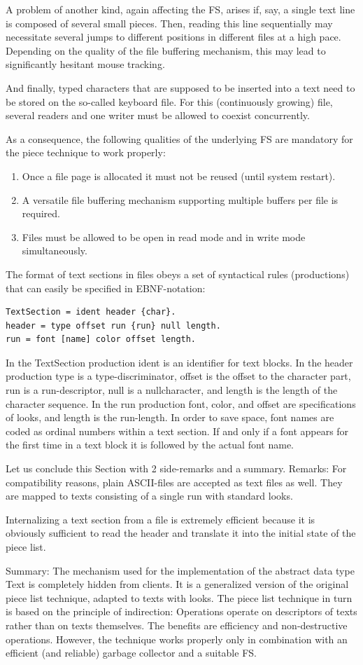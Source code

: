 A problem of another kind, again affecting the FS, arises if, say, a single text line is
composed of several small pieces. Then, reading this line sequentially may necessitate several
jumps to different positions in different files at a high pace. Depending on the quality of the file
buffering mechanism, this may lead to significantly hesitant mouse tracking.

And finally, typed characters that are supposed to be inserted into a text need to be stored on the
so-called keyboard file. For this (continuously growing) file, several readers and one writer must be
allowed to coexist concurrently.

As a consequence, the following qualities of the underlying FS are mandatory for the piece
technique to work properly:
\begin{enumerate}
  \item Once a file page is allocated it must not be reused (until system restart).
  \item A versatile file buffering mechanism supporting multiple buffers per file is required.
  \item Files must be allowed to be open in read mode and in write mode simultaneously.
\end{enumerate}
The format of text sections in files obeys a set of syntactical rules (productions) that can easily be
specified in EBNF-notation:
\begin{verbatim}
TextSection = ident header {char}.
header = type offset run {run} null length.
run = font [name] color offset length.
\end{verbatim}

In the TextSection production ident is an identifier for text blocks. In the header production type is a
type-discriminator, offset is the offset to the character part, run is a run-descriptor, null is a nullcharacter, and length is the length of the character sequence. In the run production font, color, and
offset are specifications of looks, and length is the run-length. In order to save space, font names
are coded as ordinal numbers within a text section. If and only if a font appears for the first time in a
text block it is followed by the actual font name.

Let us conclude this Section with 2 side-remarks and a summary.
Remarks:
For compatibility reasons, plain ASCII-files are accepted as text files as well. They are mapped
to texts consisting of a single run with standard looks.

Internalizing a text section from a file is extremely efficient because it is obviously sufficient to
read the header and translate it into the initial state of the piece list.

Summary: The mechanism used for the implementation of the abstract data type Text is completely
hidden from clients. It is a generalized version of the original piece list technique, adapted to texts
with looks. The piece list technique in turn is based on the principle of indirection: Operations
operate on descriptors of texts rather than on texts themselves. The benefits are efficiency and
non-destructive operations. However, the technique works properly only in combination with an
efficient (and reliable) garbage collector and a suitable FS.

